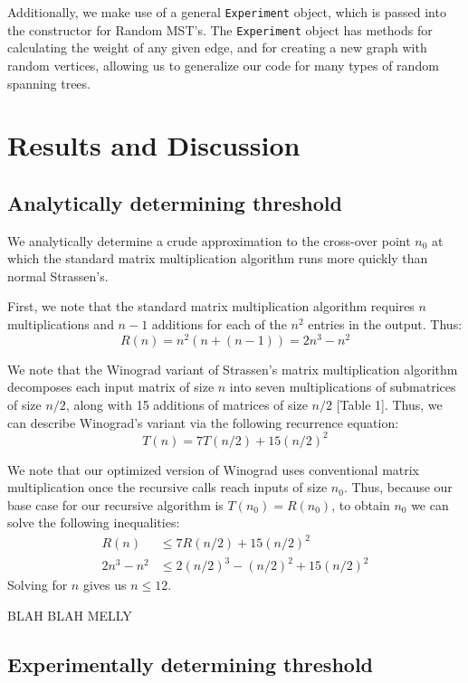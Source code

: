 \documentclass[a4paper]{article}
\begin{document}
Additionally, we make use of a general \texttt{Experiment} object, which is passed into the constructor for Random MST's. The \texttt{Experiment} object has methods for calculating the weight of any given edge, and for creating a new graph with random vertices, allowing us to generalize our code for many types of random spanning trees. 

\section{Results and Discussion}

\subsection{Analytically determining threshold}
We analytically determine a crude approximation to the cross-over point $n_0$ at which the standard matrix multiplication algorithm runs more quickly than normal Strassen's.

First, we note that the standard matrix multiplication algorithm requires $n$ multiplications and $n-1$ additions for each of the $n^2$ entries in the output. Thus:
$$R(n) = n^2(n + (n-1)) = 2n^3 - n^2$$

We note that the Winograd variant of Strassen's matrix multiplication algorithm decomposes each input matrix of size $n$ into seven multiplications of submatrices of size $n/2$, along with 15 additions of matrices of size $n/2$ [Table 1]. Thus, we can describe Winograd's variant via the following recurrence equation: 
$$T(n) = 7T(n/2) + 15(n/2)^2$$

We note that our optimized version of Winograd uses conventional matrix multiplication once the recursive calls reach inputs of size $n_0$. Thus, because our base case for our recursive algorithm is $T(n_0) = R(n_0)$, to obtain $n_0$ we can solve the following inequalities:
\begin{align*}
R(n) &\leq 7R(n/2) + 15(n/2)^2 \\
2n^3-n^2 &\leq 2(n/2)^3 - (n/2)^2 + 15(n/2)^2
\end{align*}
Solving for $n$ gives us $n \leq 12$. 

BLAH BLAH MELLY


\subsection{Experimentally determining threshold}
\end{document}

